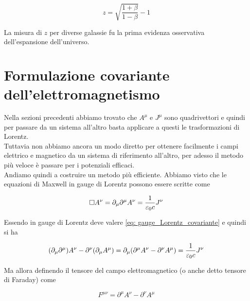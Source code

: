 \begin{equation}
    z = \sqrt{\frac{1+\beta}{1-\beta}} - 1
\end{equation}

La misura di $z$ per diverse galassie fu la prima evidenza osservativa dell'espansione dell'universo.

\newpage

\section{Formulazione covariante dell'elettromagnetismo}

Nella sezioni precedenti abbiamo trovato che $A^{\mu}$ e $J^{\mu}$ sono quadrivettori e quindi per passare da un sistema all'altro basta applicare a questi le trasformazioni di Lorentz.\\

Tuttavia non abbiamo ancora un modo diretto per ottenere facilmente i campi elettrico e magnetico da un sistema di riferimento all'altro, per adesso il metodo più veloce è passare per i potenziali efficaci. \\

Andiamo quindi a costruire un metodo più efficiente. Abbiamo visto che le equazioni di Maxwell in gauge di Lorentz possono essere scritte come 

\begin{equation}
    \Box A^{\nu} = \partial_{\mu}\partial^{\mu} A^{\nu} = \frac{1}{\varepsilon_0 c} J^{\nu}
\end{equation}

Essendo in gauge di Lorentz deve valere \eqref{eq: gauge_Lorentz_covariante} e quindi si ha 

\begin{equation}
    (\partial_{\mu}\partial^{\mu}) A^{\nu} - \partial^{\nu} (\partial_{\mu} A^{\mu}) = \partial_{\mu} (\partial^{\mu}A^{\nu} - \partial^{\nu} A^{\mu}) = \frac{1}{\varepsilon_0 c} J^{\nu}
\end{equation}

Ma allora definendo il tensore del campo elettromagnetico (o anche detto tensore di Faraday)  come 

\begin{tcolorbox}[colback=yellow!10!white, colframe=orange!70!black, boxrule=0.8pt]
\begin{equation}
    F^{\mu \nu} = \partial^{\mu} A^{\nu} - \partial^{\nu} A^{\mu}
\end{equation}
\end{tcolorbox}

